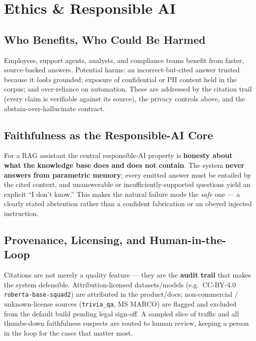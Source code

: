 \documentclass[12pt,a4paper]{article}
\begin{document}
\section{Ethics \& Responsible AI}

\subsection{Who Benefits, Who Could Be Harmed}

Employees, support agents, analysts, and compliance teams benefit from faster, source-backed answers. Potential harms: an incorrect-but-cited answer trusted because it \emph{looks} grounded; exposure of confidential or PII content held in the corpus; and over-reliance on automation. These are addressed by the citation trail (every claim is verifiable against its source), the privacy controls above, and the abstain-over-hallucinate contract.

\subsection{Faithfulness as the Responsible-AI Core}

For a RAG assistant the central responsible-AI property is \textbf{honesty about what the knowledge base does and does not contain}. The system \textbf{never answers from parametric memory}; every emitted answer must be entailed by the cited context, and unanswerable or insufficiently-supported questions yield an explicit ``I don't know.'' This makes the natural failure mode the \emph{safe} one --- a clearly stated abstention rather than a confident fabrication or an obeyed injected instruction.

\subsection{Provenance, Licensing, and Human-in-the-Loop}

Citations are not merely a quality feature --- they are the \textbf{audit trail} that makes the system defensible. Attribution-licensed datasets/models (e.g.\ CC-BY-4.0 \texttt{roberta-base-squad2}) are attributed in the product/docs; non-commercial / unknown-license sources (\texttt{trivia\_qa}, MS MARCO) are flagged and excluded from the default build pending legal sign-off. A sampled slice of traffic and all thumbs-down faithfulness suspects are routed to human review, keeping a person in the loop for the cases that matter most.
\end{document}
